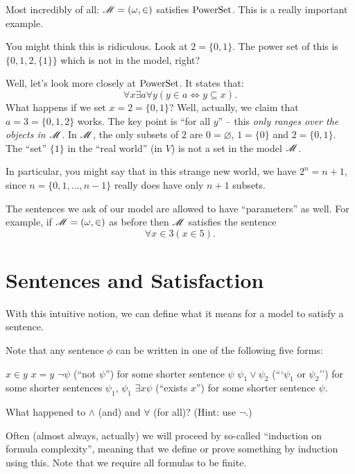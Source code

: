 \begin{example}
	Most incredibly of all: $\mathscr M = (\omega, \in)$ satisfies $\mathrm{PowerSet}$.
	This is a really important example.
	
	You might think this is ridiculous. Look at $2 = \{0,1\}$.
	The power set of this is $\{0, 1, 2, \{1\}\}$ which is not in the model, right?

	Well, let's look more closely at $\mathrm{PowerSet}$. It states that:
	\[ \forall x \exists a \forall y (y \in a \iff y \subseteq x). \]
	What happens if we set $x = 2 = \{0,1\}$?
	Well, actually, we claim that $a = 3 = \{0,1,2\}$ works.
	The key point is ``for all $y$'' -- this \emph{only ranges over the objects in $\mathscr M$}.
	In $\mathscr M$, the only subsets of $2$ are $0 = \varnothing$,
	$1 = \{0\}$ and $2 = \{0,1\}$.
	The ``set'' $\{1\}$ in the ``real world'' (in $V$) is not a set in the model $\mathscr M$.

	In particular, you might say that in this strange new world,
	we have $2^n = n+1$, since $n = \{0,1,\dots,n-1\}$ really does
	have only $n+1$ subsets.
\end{example}

\begin{example}
	The sentences we ask of our model are allowed to have ``parameters'' as well.
	For example, if $\mathscr M = (\omega, \in)$ as before then $\mathscr M$ satisfies the sentence
	\[ \forall x \in 3 (x \in 5). \]
\end{example}

\section{Sentences and Satisfaction}
With this intuitive notion, we can define what it means for a model to satisfy a sentence.
\begin{definition}
Note that any sentence $\phi$ can be written in one of the following five forms:
\begin{itemize}
	\ii $x \in y$
	\ii $x = y$
	\ii $\neg \psi$ (``not $\psi$'') for some shorter sentence $\psi$
	\ii $\psi_1 \lor \psi_2$ (```$\psi_1$ or $\psi_2$'')
	for some shorter sentences $\psi_1$, $\psi_1$
	\ii $\exists x \psi$ (``exists $x$'') for some shorter sentence $\psi$.
\end{itemize}
\end{definition}
\begin{ques}
	What happened to $\land$ (and) and $\forall$ (for all)?
	(Hint: use $\neg$.)
\end{ques}
Often (almost always, actually) we will proceed by so-called ``induction on formula complexity'',
meaning that we define or prove something by induction using this.
Note that we require all formulas to be finite.

